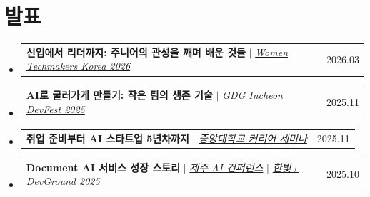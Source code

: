 \documentclass[letterpaper,11pt]{article}
\makeatletter
\newcommand{\resumeProjectHeading}[2]{
    \item
    \begin{tabular*}{0.97\textwidth}{l@{\extracolsep{\fill}}r}
      \small #1 & #2 \\
    \end{tabular*}\vspace{-7pt}
}
\newcommand{\resumeSubHeadingListStart}{\begin{itemize}[leftmargin=*]}
\newcommand{\resumeSubHeadingListEnd}{\end{itemize}}
\makeatother
\begin{document}
\section{발표}
  \resumeSubHeadingListStart
    \resumeProjectHeading
      {\textbf{신입에서 리더까지: 주니어의 관성을 깨며 배운 것들} $|$ \emph{\href{https://www.slideshare.net/slideshow/from-junior-developer-to-tech-lead-leveraging-ai-for-leadership-and-team-impact/286718141}{Women Techmakers Korea 2026}}}{2026.03}
    \resumeProjectHeading
      {\textbf{AI로 굴러가게 만들기: 작은 팀의 생존 기술} $|$ \emph{\href{https://www.slideshare.net/slideshow/gdg-incheon-2025-ai/284715174}{GDG Incheon DevFest 2025}}}{2025.11}
    \resumeProjectHeading
      {\textbf{취업 준비부터 AI 스타트업 5년차까지} $|$ \emph{\href{https://www.slideshare.net/slideshow/2025-ai-5/284715261}{중앙대학교 커리어 세미나}}}{2025.11}
    \resumeProjectHeading
      {\textbf{Document AI 서비스 성장 스토리} $|$ \emph{\href{https://www.slideshare.net/slideshow/mlops-api-solarbox-document-ai/283755773}{제주 AI 컨퍼런스}} $|$ \emph{\href{https://www.hanbit.co.kr/product/C2486251278}{한빛+ DevGround 2025}}}{2025.10}
  \resumeSubHeadingListEnd


\end{document}
